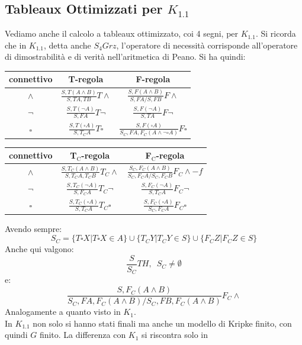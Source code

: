 \documentclass[a4paper,12pt, oneside]{book}
\begin{document}
\subsection{Tableaux Ottimizzati per $K_{1.1}$}
Vediamo anche il calcolo a tableaux ottimizzato, coi 4 segni, per $K_{1.1}$. Si
ricorda che in $K_{1.1}$, detta anche $S_4Grz$, l'operatore di necessità
corrisponde all'operatore di dimostrabilità e di verità nell'aritmetica di
Peano. Si ha quindi:
\begin{table}[H]
  \Large
  \centering
  \begin{tabular}{c||c|c}
    connettivo& T-regola& F-regola\\
    \hline
    \hline
    $\land$ & $\frac{S,T(A\land B)}{S,TA,TB}T\land$&
                        $\frac{S,F(A\land B)}{S,FA/S,FB}F\land$\\
    \hline
    $\neg$ & $\frac{S,T(\neg A)}{S,FA}T\neg$&
                        $\frac{S,F(\neg A)}{S,TA}F\neg$\\
    \hline
    $\square$ & $\frac{S,T(\square A)}{S,T_CA}T\square$&
             $\frac{S,F(\square A)}{S_C,FA,F_C(A\land\neg\square A)}F\square$\\
  \end{tabular}
\end{table}
\begin{table}[H]
  \Large
  \centering
  \begin{tabular}{c||c|c}
    connettivo& T$_{\mbox{C}}$-regola&F$_{\mbox{C}}$-regola\\
    \hline
    \hline
    $\land$ & $\frac{S,T_C(A\land B)}{S,T_CA,T_CB}T_C\land$&
              $\frac{S_C,F_C(A\land B)}{S_C,F_CA/S_C,F_CB}F_C\land -f$\\
    \hline
    $\neg$ & $\frac{S,T_C(\neg A)}{S,F_CA}T_C\neg$&
            $\frac{S,F_C(\neg A)}{S,T_CA}F_C\neg$\\
    \hline
    $\square$ & $\frac{S,T_C(\square A)}{S,T_CA}T_C\square$ &
               $\frac{S,F_C(\square A)}{S_C,F_CA}F_C\square$
  \end{tabular}
\end{table}
Avendo sempre:
\[S_C=\{T\square X|T\square X\in A\}\cup\{T_CY|T_CY\in S\}
  \cup\{F_CZ|F_CZ\in S\}\]
Anche qui valgono:
\[\frac{S}{S_C}TH,\,\,\,S_C\neq \emptyset\]
e:
\[\frac{S,F_C(A\land B)}{S_C,FA,F_C(A\land B)/S_C,FB,F_C(A\land B)}F_C\land\]
Analogamente a quanto visto in $K_1$.\\
In $K_{1.1}$ non solo si hanno stati finali ma anche un modello di Kripke
finito, con quindi $G$ finito. La differenza con $K_1$ si riscontra solo in
\end{document}
